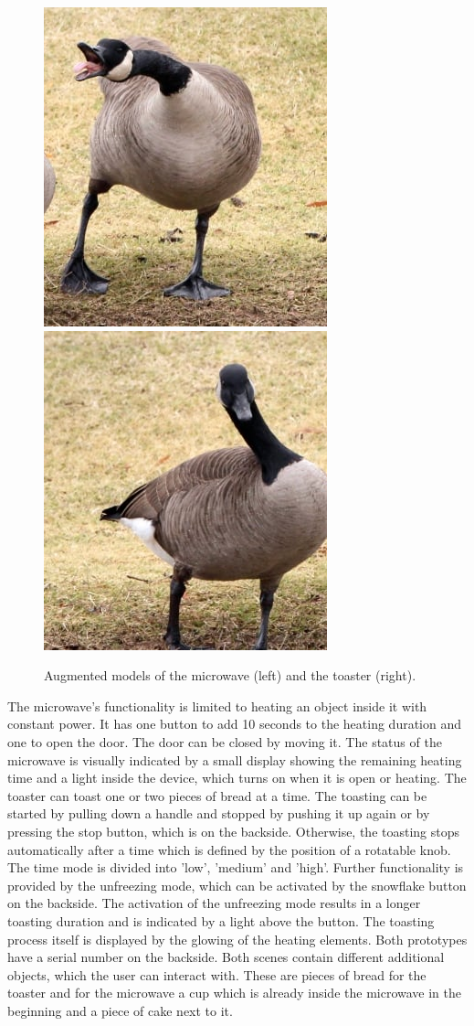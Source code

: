 \documentclass[11pt, a4paper]{article}
\begin{document}
			\begin{figure}[H]
				\centering
				\includegraphics[width=.4\textwidth]{img/prototypes/microwave.png}
				\hspace{.5em}
				\includegraphics[width=.4\textwidth]{img/prototypes/toaster.png}
				\caption{Augmented models of the microwave (left) and the toaster (right).}
				\label{fig:microwaveandtoaster}
			\end{figure}

			The microwave's functionality is limited to heating an object inside it with constant power. It has one button to add 10 seconds to the heating duration and one to open the door. The door can be closed by moving it. The status of the microwave is visually indicated by a small display showing the remaining heating time and a light inside the device, which turns on when it is open or heating. The toaster can toast one or two pieces of bread at a time. The toasting can be started by pulling down a handle and stopped by pushing it up again or by pressing the stop button, which is on the backside. Otherwise, the toasting stops automatically after a time which is defined by the position of a rotatable knob. The time mode is divided into 'low', 'medium' and 'high'. Further functionality is provided by the unfreezing mode, which can be activated by the snowflake button on the backside. The activation of the unfreezing mode results in a longer toasting duration and is indicated by a light above the button. The toasting process itself is displayed by the glowing of the heating elements. Both prototypes have a serial number on the backside. Both scenes contain different additional objects, which the user can interact with. These are pieces of bread for the toaster and for the microwave a cup which is already inside the microwave in the beginning and a piece of cake next to it.
			
\end{document}
